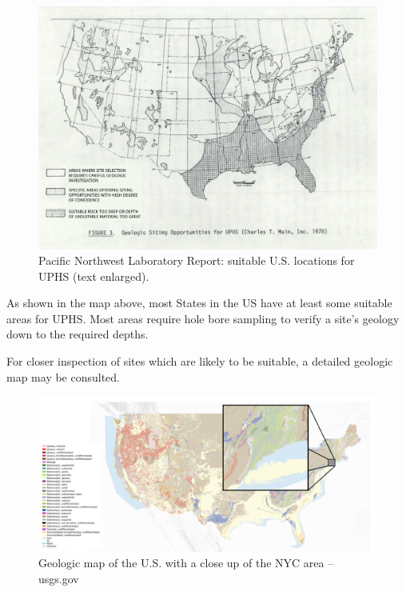\documentclass[hidelinks,12pt,a4paper]{article}
\begin{document}
\begin{figure}[ht!]
    \centering
    \includegraphics[width=1\textwidth]{pnl-report-geologic-siting-opportunities-for-uphs-text-overlay.jpg}
    \caption{Pacific Northwest Laboratory Report: suitable U.S. locations for UPHS (text enlarged). \cite{UndergroundPumpedHydroelectricStorage}}
\end{figure}
\FloatBarrier

As shown in the map above, most States in the US have at least some suitable areas for UPHS. Most areas require hole bore sampling to verify a site's geology down to the required depths.

For closer inspection of sites which are likely to be suitable, a detailed geologic map may be consulted.

\begin{figure}[ht!]
    \centering
    \includegraphics[width=1\textwidth]{usgs-gov-map-of-new-york-city-area.png}
    \caption{Geologic map of the U.S. with a close up of the NYC area -- usgs.gov \cite{MineralResourcesOnlineSpatialDataGeologicmaps}}
\end{figure}
\FloatBarrier
\end{document}
